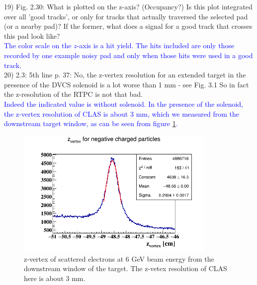 19) Fig. 2.30: What is plotted on the z-axis? (Occupancy?) Is this plot 
integrated over all 'good tracks', or only for tracks that actually traversed 
the selected pad (or a nearby pad)? If the former, what does a signal for a 
good track that crosses this pad look like?\\
  \textcolor{blue}{The color scale on the $z$-axis is a hit yield. The
hits included are only those recorded by one example noisy pad and only when
those hits were used in a good track.} \\


20) 2.3: 5th line p. 37: No, the z-vertex resolution for an extended target in 
the presence of the DVCS solenoid is a lot worse than 1 mm - see Fig. 3.1 So in 
fact the z-resolution of the RTPC is not that bad.\\
 \textcolor{blue}{Indeed the indicated value is without solenoid. In the presence of 
the solenoid, the z-vertex resolution of 
CLAS is about 3 mm, which we measured from the downstream target 
window, as can be seen from figure \ref{fig:z_electron_res}.}\\

\begin{figure}[tbp]
\centering
\includegraphics[height=6.2cm]{fig/clas_z_resolution.png}
\caption{ z-vertex of scattered electrons at 6 GeV beam energy from the 
downstream window of the target. The z-vetex resolution of CLAS here is about 3 
mm.}
\label{fig:z_electron_res}
\end{figure}

